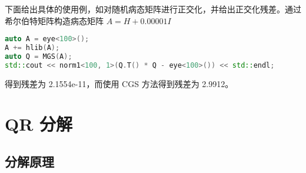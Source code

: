 下面给出具体的使用例，如对随机病态矩阵进行正交化，并给出正交化残差。通过希尔伯特矩阵构造病态矩阵 $A=H+0.00001I$
\begin{tcolorbox}
    \begin{center}
        \begin{minipage}{.92\linewidth}
            \begin{lstlisting}[language=C++]
auto A = eye<100>();
A += hlib(A);
auto Q = MGS(A);
std::cout << norm1<100, 1>(Q.T() * Q - eye<100>()) << std::endl;
\end{lstlisting}
        \end{minipage}
    \end{center}
\end{tcolorbox}
得到残差为 2.1554e-11，而使用 CGS 方法得到残差为 2.9912。

\section{QR 分解}
\subsection{分解原理}

